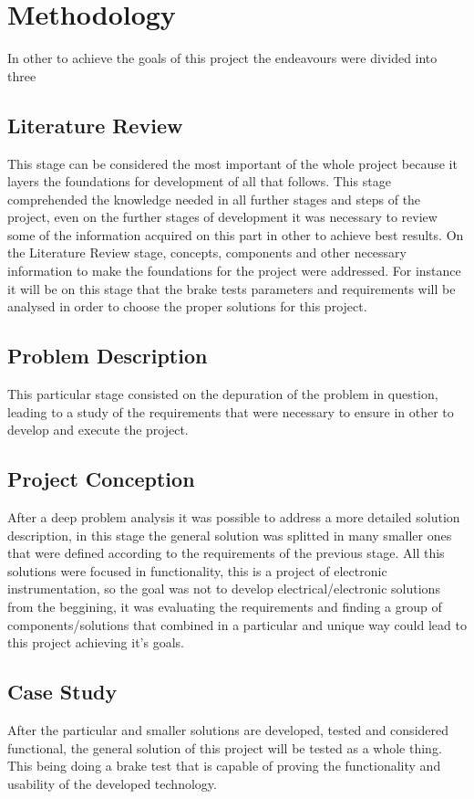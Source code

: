 \chapter{Methodology}\label{ch:methodology}

	In other to achieve the goals of this project the endeavours were divided into three 

	\section{Literature Review}\label{sec:literature-review}
		This stage can be considered the most important of the whole project because it layers the foundations for development of all that follows. This stage comprehended the knowledge needed in all further stages and steps of the project, even on the further stages of development it was necessary to review some of the information acquired on this part in other to achieve best results. On the Literature Review stage, concepts, components and other necessary information to make the foundations for the project were addressed. For instance it will be on this stage that the brake tests parameters and requirements will be analysed in order to choose the proper solutions for this project.

	\section{Problem Description}\label{sec:problem-description}
		This particular stage consisted on the depuration of the problem in question, leading to a study of the requirements that were necessary to ensure in other to develop and execute the project. 

	\section{Project Conception}\label{sec:project-conception}
		After a deep problem analysis it was possible to address a more detailed solution description, in this stage the general solution was splitted in many smaller ones that were defined according to the requirements of the previous stage. All this solutions were focused in functionality, this is a project of electronic instrumentation, so the goal was not to develop electrical/electronic solutions from the beggining, it was evaluating the requirements and finding a group of components/solutions that combined in a particular and unique way could lead to this project achieving it's goals.
		
	\section{Case Study}\label{sec:case-study}
		After the particular and smaller solutions are developed, tested and considered functional, the general solution of this project will be tested as a whole thing. This being doing a brake test that is capable of proving the functionality and usability of the developed technology.
